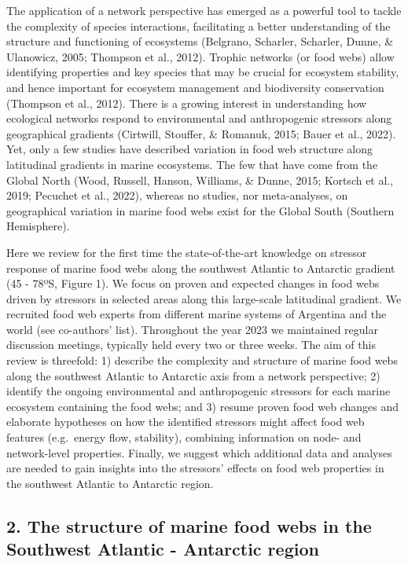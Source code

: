 \documentclass[
]{article}
\begin{document}
The application of a network perspective has emerged as a powerful tool
to tackle the complexity of species interactions, facilitating a better
understanding of the structure and functioning of ecosystems (Belgrano,
Scharler, Scharler, Dunne, \& Ulanowicz, 2005; Thompson et al., 2012).
Trophic networks (or food webs) allow identifying properties and key
species that may be crucial for ecosystem stability, and hence important
for ecosystem management and biodiversity conservation (Thompson et al.,
2012). There is a growing interest in understanding how ecological
networks respond to environmental and anthropogenic stressors along
geographical gradients (Cirtwill, Stouffer, \& Romanuk, 2015; Bauer et
al., 2022). Yet, only a few studies have described variation in food web
structure along latitudinal gradients in marine ecosystems. The few that
have come from the Global North (Wood, Russell, Hanson, Williams, \&
Dunne, 2015; Kortsch et al., 2019; Pecuchet et al., 2022), whereas no
studies, nor meta-analyses, on geographical variation in marine food
webs exist for the Global South (Southern Hemisphere).

Here we review for the first time the state-of-the-art knowledge on
stressor response of marine food webs along the southwest Atlantic to
Antarctic gradient (45 - 78ºS, Figure 1). We focus on proven and
expected changes in food webs driven by stressors in selected areas
along this large-scale latitudinal gradient. We recruited food web
experts from different marine systems of Argentina and the world (see
co-authors' list). Throughout the year 2023 we maintained regular
discussion meetings, typically held every two or three weeks. The aim of
this review is threefold: 1) describe the complexity and structure of
marine food webs along the southwest Atlantic to Antarctic axis from a
network perspective; 2) identify the ongoing environmental and
anthropogenic stressors for each marine ecosystem containing the food
webs; and 3) resume proven food web changes and elaborate hypotheses on
how the identified stressors might affect food web features (e.g.~energy
flow, stability), combining information on node- and network-level
properties. Finally, we suggest which additional data and analyses are
needed to gain insights into the stressors' effects on food web
properties in the southwest Atlantic to Antarctic region.

\hypertarget{the-structure-of-marine-food-webs-in-the-southwest-atlantic---antarctic-region}{%
\subsection{2. The structure of marine food webs in the Southwest
Atlantic - Antarctic
region}\label{the-structure-of-marine-food-webs-in-the-southwest-atlantic---antarctic-region}}
\end{document}
